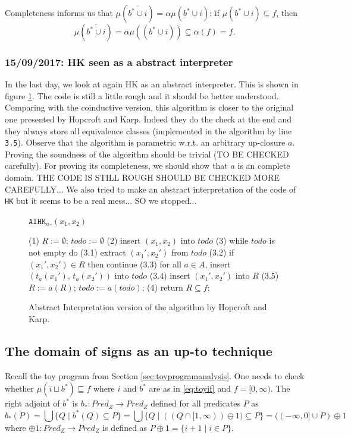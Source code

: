 \documentclass{llncs}
\begin{document}
Completeness informs us that $\mu  (\overline{b^*\cup i}) = \alpha  \mu (b^*\cup i)$: if $\mu (b^*\cup i) \subseteq f$, then $$\mu (\overline{b^*\cup i})  = \alpha \mu ((b^*\cup i)) \subseteq \alpha(f) = f\text{.}$$

\subsubsection{15/09/2017: HK seen as a abstract interpreter}
In the last day, we look at again HK as an abstract interpreter. This is shown in figure \ref{fig:HKAI}. The code is still a little rough and it should be better understood. Comparing with the coinductive version, this algorithm is closer to the original one presented by Hopcroft and Karp. Indeed they do the check at the end and they always store all equivalence classes (implemented in the algorithm by line \texttt{3.5}). 
Observe that the algorithm is parametric w.r.t. an arbitrary up-closure $a$. Proving the soundness of the algorithm should be trivial (TO BE CHECKED carefully). For proving its completeness, we should show that $a$ is an complete domain. THE CODE IS STILL ROUGH SHOULD BE CHECKED MORE CAREFULLY... We also tried to make an abstract interpretation of the code of \texttt{HK} but it seems to be a real mess... SO we stopped...

\begin{figure}[t]
\centering
\underline{$\texttt{AIHK}_a$ $(x_1,x_2)$}
\begin{codeNT}
(1) $R := \emptyset$; $todo := \emptyset$
(2) insert $(x_1,x_2)$ into $todo$
(3) while $todo$ is not empty do 
   (3.1)  extract $(x_1',x_2')$ from $todo$
   (3.2)  if $(x_1',x_2')\in R$ then continue
   (3.3)  for all $a\in A$, 
             insert $(t_a(x_1'),\,t_a(x_2'))$ into $todo$
   (3.4)  insert $(x_1',x_2')$ into $R$ 
   (3.5) $R:= a(R)$; $todo:=a(todo)$;
(4) return $R \subseteq f$; 
\end{codeNT}
\caption{Abstract Interpretation version of the algorithm by Hopcroft and Karp.}
\label{fig:HKAI}
\end{figure}

\subsection{The domain of signs as an up-to technique}\label{sec:signupto} 

Recall the toy program from Section \ref{sec:toyprogramanalysis}. One needs to check whether $\mu (i \sqcup b^*) \sqsubseteq f$ where $i$ and $b^*$ are as in \eqref{eq:toyif} and $f=[0,\infty)$. The right adjoint of $b^*$ is $b_*\colon Pred_Z\to Pred_Z$ defined for all predicates $P$ as
$$b_*(P) = \bigcup \{Q \mid b^*(Q)\subseteq P\} =  \bigcup \{Q \mid ( (Q\cap [1,\infty) ) \ominus\! 1 )\subseteq P \} = ( (-\infty,0]\cup P) \oplus\!1$$
where $\oplus \!1 \colon Pred_Z \to Pred_Z$ is defined as $P\oplus \!1 = \{i+1\mid i\in P  \}$. %
\end{document}
